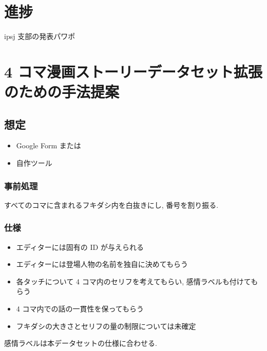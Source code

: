 \documentclass{jarticle}     %
\begin{document}



\section{進捗}
ipsj 支部の発表パワポ

\section{4 コマ漫画ストーリーデータセット拡張のための手法提案}
\subsection{想定}
\begin{itemize}
  \item Google Form または
  \item 自作ツール
\end{itemize}
\subsubsection{事前処理}
すべてのコマに含まれるフキダシ内を白抜きにし, 番号を割り振る.

\subsubsection{仕様}
\begin{itemize}
  \item エディターには固有の ID が与えられる
  \item エディターには登場人物の名前を独自に決めてもらう
  \item 各タッチについて 4 コマ内のセリフを考えてもらい, 感情ラベルも付けてもらう
  \item 4 コマ内での話の一貫性を保ってもらう
  \item フキダシの大きさとセリフの量の制限については未確定
\end{itemize}

感情ラベルは本データセットの仕様に合わせる.
\end{document}
